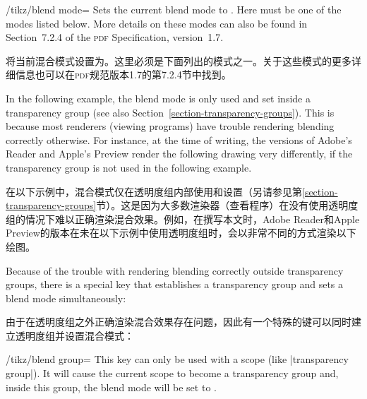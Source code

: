 \begin{key}{/tikz/blend mode=}
    Sets the current blend mode to . Here  must be one of
    the modes listed below. More details on these modes can also be found in
    Section~7.2.4 of the \textsc{pdf} Specification, version~1.7.

    将当前混合模式设置为。这里必须是下面列出的模式之一。关于这些模式的更多详细信息也可以在\textsc{pdf}规范版本1.7的第7.2.4节中找到。

    In the following example, the blend mode is only used and set inside a
    transparency group (see also Section~\ref{section-transparency-groups}).
    This is because most renderers (viewing programs) have trouble rendering
    blending correctly otherwise. For instance, at the time of writing, the
    versions of Adobe's Reader and Apple's Preview render the following drawing
    very differently, if the transparency group is not used in the following
    example.
    
    在以下示例中，混合模式仅在透明度组内部使用和设置（另请参见第\ref{section-transparency-groups}节）。这是因为大多数渲染器（查看程序）在没有使用透明度组的情况下难以正确渲染混合效果。例如，在撰写本文时，Adobe Reader和Apple Preview的版本在未在以下示例中使用透明度组时，会以非常不同的方式渲染以下绘图。


\begin{codeexample}[]
\end{codeexample}

    Because of the trouble with rendering blending correctly outside
    transparency groups, there is a special key that establishes a transparency
    group and sets a blend mode simultaneously:

    由于在透明度组之外正确渲染混合效果存在问题，因此有一个特殊的键可以同时建立透明度组并设置混合模式：

    \begin{key}{/tikz/blend group=}
        This key can only be used with a scope (like |transparency group|). It
        will cause the current scope to become a transparency group and, inside
        this group, the blend mode will be set to .


\end{key}
\end{key}
